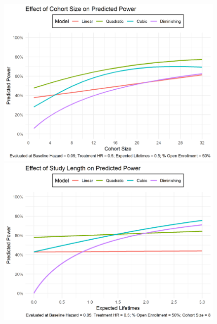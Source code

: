 \begin{figure}
\caption[Effect of Cohort Size on Power]{}
\label{fig:power-cohort-size}
\includegraphics[width=\textwidth]{reports/figures/single-effects/power-cohort-size.png}

\caption[Effect of Study Length on Power]{}
\label{fig:power-expected-lifetimes}
\includegraphics[width=\textwidth]{reports/figures/single-effects/power-expected-lifetimes.png}
\end{figure}

